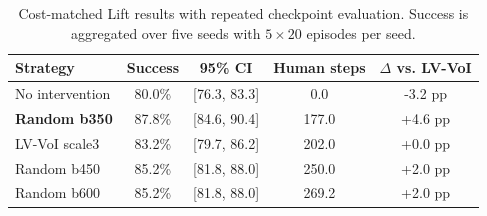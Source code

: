 \begin{table}[t]
\centering
\caption{Cost-matched Lift results with repeated checkpoint evaluation. Success is aggregated over five seeds with $5\times20$ episodes per seed.}
\label{tab:cost_matched_lift}
\begin{tabular}{lcccc}
\toprule
Strategy & Success & 95\% CI & Human steps & $\Delta$ vs. LV-VoI \\
\midrule
No intervention & 80.0\% & [76.3, 83.3] & 0.0 & -3.2 pp \\
\textbf{Random b350} & 87.8\% & [84.6, 90.4] & 177.0 & +4.6 pp \\
LV-VoI scale3 & 83.2\% & [79.7, 86.2] & 202.0 & +0.0 pp \\
Random b450 & 85.2\% & [81.8, 88.0] & 250.0 & +2.0 pp \\
Random b600 & 85.2\% & [81.8, 88.0] & 269.2 & +2.0 pp \\
\bottomrule
\end{tabular}
\end{table}

